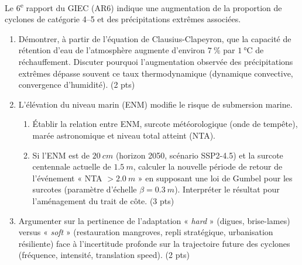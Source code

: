 \documentclass[11pt]{article}
\begin{document}
\begin{exercice}
Le 6\textsuperscript{e} rapport du GIEC (AR6) indique une augmentation de la proportion de cyclones de catégorie 4--5 et des précipitations extrêmes associées.

\begin{enumerate}
\item Démontrer, à partir de l'équation de Clausius-Clapeyron, que la capacité de rétention d'eau de l'atmosphère augmente d'environ $\SI{7}{\percent}$ par $\SI{1}{\celsius}$ de réchauffement. Discuter pourquoi l'augmentation observée des précipitations extrêmes dépasse souvent ce taux thermodynamique (dynamique convective, convergence d'humidité). (2 pts)
\item L'élévation du niveau marin (ENM) modifie le risque de submersion marine. 
\begin{enumerate}
\item Établir la relation entre ENM, surcote météorologique (onde de tempête), marée astronomique et niveau total atteint (NTA). 
\item Si l'ENM est de $\SI{20}{cm}$ (horizon 2050, scénario SSP2-4.5) et la surcote centennale actuelle de $\SI{1,5}{m}$, calculer la nouvelle période de retour de l'événement « NTA $> \SI{2,0}{m}$ » en supposant une loi de Gumbel pour les surcotes (paramètre d'échelle $\beta = \SI{0,3}{m}$). Interpréter le résultat pour l'aménagement du trait de côte. (3 pts)
\end{enumerate}
\item Argumenter sur la pertinence de l'adaptation « \textit{hard} » (digues, brise-lames) versus « \textit{soft} » (restauration mangroves, repli stratégique, urbanisation résiliente) face à l'incertitude profonde sur la trajectoire future des cyclones (fréquence, intensité, translation speed). (2 pts)
\end{enumerate}
\end{exercice}
\end{document}
